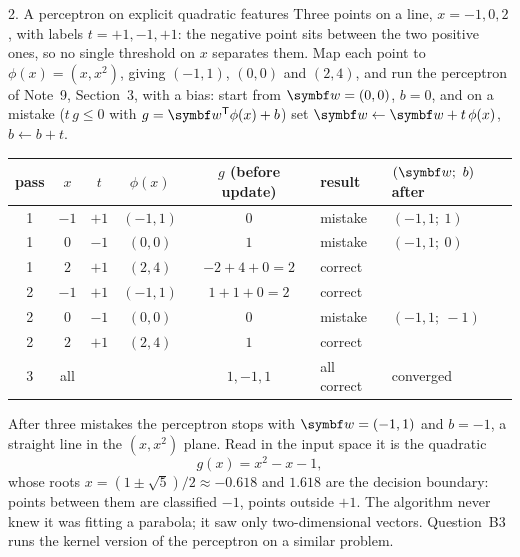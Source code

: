 \documentclass[11pt]{article}
\newcommand{\w}{\vect{w}}
\begin{document}
\begin{worked}{2. A perceptron on explicit quadratic features}
Three points on a line, $x = -1, 0, 2$, with labels $t = +1, -1, +1$: the negative point sits between the two positive
ones, so no single threshold on $x$ separates them. Map each point to $\phi(x) = (x, x^2)$, giving $(-1, 1)$, $(0, 0)$
and $(2, 4)$, and run the perceptron of Note~9, Section~3, with a bias: start from $\w = (0, 0)$, $b = 0$, and on a
mistake ($t\,g \le 0$ with $g = \w\T\phi(x) + b$) set $\w \gets \w + t\,\phi(x)$, $b \gets b + t$.
\begin{center}\small
\begin{tabular}{@{}cccccll@{}}
\toprule
pass & $x$ & $t$ & $\phi(x)$ & $g$ (before update) & result & $(\w;\ b)$ after \\
\midrule
1 & $-1$ & $+1$ & $(-1, 1)$ & $0$ & mistake & $(-1, 1;\ 1)$ \\
1 & $0$ & $-1$ & $(0, 0)$ & $1$ & mistake & $(-1, 1;\ 0)$ \\
1 & $2$ & $+1$ & $(2, 4)$ & $-2 + 4 + 0 = 2$ & correct & \\
2 & $-1$ & $+1$ & $(-1, 1)$ & $1 + 1 + 0 = 2$ & correct & \\
2 & $0$ & $-1$ & $(0, 0)$ & $0$ & mistake & $(-1, 1;\ -1)$ \\
2 & $2$ & $+1$ & $(2, 4)$ & $1$ & correct & \\
3 & all & & & $1, -1, 1$ & all correct & converged \\
\bottomrule
\end{tabular}
\end{center}
After three mistakes the perceptron stops with $\w = (-1, 1)$ and $b = -1$, a straight line in the $(x, x^2)$ plane.
Read in the input space it is the quadratic
\[
  g(x) = x^2 - x - 1 ,
\]
whose roots $x = (1 \pm \sqrt5)/2 \approx -0.618$ and $1.618$ are the decision boundary: points between them are
classified $-1$, points outside $+1$. The algorithm never knew it was fitting a parabola; it saw only two-dimensional
vectors. Question~B3 runs the kernel version of the perceptron on a similar problem.
\end{worked}
\end{document}
